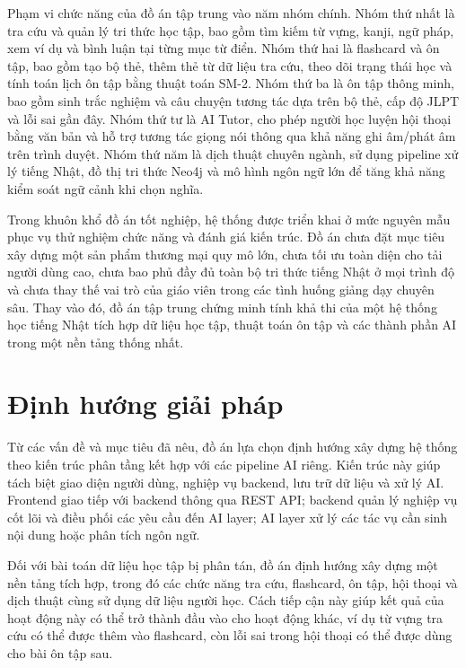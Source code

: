 \documentclass[../DoAn.tex]{subfiles}
\begin{document}
Phạm vi chức năng của đồ án tập trung vào năm nhóm chính. Nhóm thứ nhất là tra cứu và quản lý tri thức học tập, bao gồm tìm kiếm từ vựng, kanji, ngữ pháp, xem ví dụ và bình luận tại từng mục từ điển. Nhóm thứ hai là flashcard và ôn tập, bao gồm tạo bộ thẻ, thêm thẻ từ dữ liệu tra cứu, theo dõi trạng thái học và tính toán lịch ôn tập bằng thuật toán SM-2. Nhóm thứ ba là ôn tập thông minh, bao gồm sinh trắc nghiệm và câu chuyện tương tác dựa trên bộ thẻ, cấp độ JLPT và lỗi sai gần đây. Nhóm thứ tư là AI Tutor, cho phép người học luyện hội thoại bằng văn bản và hỗ trợ tương tác giọng nói thông qua khả năng ghi âm/phát âm trên trình duyệt. Nhóm thứ năm là dịch thuật chuyên ngành, sử dụng pipeline xử lý tiếng Nhật, đồ thị tri thức Neo4j và mô hình ngôn ngữ lớn để tăng khả năng kiểm soát ngữ cảnh khi chọn nghĩa.

Trong khuôn khổ đồ án tốt nghiệp, hệ thống được triển khai ở mức nguyên mẫu phục vụ thử nghiệm chức năng và đánh giá kiến trúc. Đồ án chưa đặt mục tiêu xây dựng một sản phẩm thương mại quy mô lớn, chưa tối ưu toàn diện cho tải người dùng cao, chưa bao phủ đầy đủ toàn bộ tri thức tiếng Nhật ở mọi trình độ và chưa thay thế vai trò của giáo viên trong các tình huống giảng dạy chuyên sâu. Thay vào đó, đồ án tập trung chứng minh tính khả thi của một hệ thống học tiếng Nhật tích hợp dữ liệu học tập, thuật toán ôn tập và các thành phần AI trong một nền tảng thống nhất.

\section{Định hướng giải pháp}
\label{section:1.3}

Từ các vấn đề và mục tiêu đã nêu, đồ án lựa chọn định hướng xây dựng hệ thống theo kiến trúc phân tầng kết hợp với các pipeline AI riêng. Kiến trúc này giúp tách biệt giao diện người dùng, nghiệp vụ backend, lưu trữ dữ liệu và xử lý AI. Frontend giao tiếp với backend thông qua REST API; backend quản lý nghiệp vụ cốt lõi và điều phối các yêu cầu đến AI layer; AI layer xử lý các tác vụ cần sinh nội dung hoặc phân tích ngôn ngữ.

Đối với bài toán dữ liệu học tập bị phân tán, đồ án định hướng xây dựng một nền tảng tích hợp, trong đó các chức năng tra cứu, flashcard, ôn tập, hội thoại và dịch thuật cùng sử dụng dữ liệu người học. Cách tiếp cận này giúp kết quả của hoạt động này có thể trở thành đầu vào cho hoạt động khác, ví dụ từ vựng tra cứu có thể được thêm vào flashcard, còn lỗi sai trong hội thoại có thể được dùng cho bài ôn tập sau.
\end{document}
